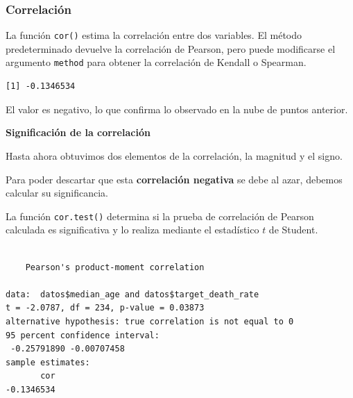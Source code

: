 \documentclass[
  letterpaper,
  DIV=11,
  numbers=noendperiod]{scrartcl}
\newenvironment{Shaded}{\begin{snugshade}}{\end{snugshade}}
\newcommand{\AttributeTok}[1]{\textcolor[rgb]{0.40,0.45,0.13}{#1}}
\newcommand{\FunctionTok}[1]{\textcolor[rgb]{0.28,0.35,0.67}{#1}}
\newcommand{\NormalTok}[1]{\textcolor[rgb]{0.00,0.23,0.31}{#1}}
\newcommand{\SpecialCharTok}[1]{\textcolor[rgb]{0.37,0.37,0.37}{#1}}
\newcommand{\StringTok}[1]{\textcolor[rgb]{0.13,0.47,0.30}{#1}}
\begin{document}
\subsubsection{Correlación}\label{correlaciuxf3n}

La función \texttt{cor()} estima la correlación entre dos variables. El
método predeterminado devuelve la correlación de Pearson, pero puede
modificarse el argumento \texttt{method} para obtener la correlación de
Kendall o Spearman.

\begin{Shaded}
\end{Shaded}

\begin{verbatim}
[1] -0.1346534
\end{verbatim}

El valor es negativo, lo que confirma lo observado en la nube de puntos
anterior.

\textbf{Significación de la correlación}

Hasta ahora obtuvimos dos elementos de la correlación, la magnitud y el
signo.

Para poder descartar que esta \textbf{correlación negativa} se debe al
azar, debemos calcular su significancia.

La función \texttt{cor.test()} determina si la prueba de correlación de
Pearson calculada es significativa y lo realiza mediante el estadístico
\(t\) de Student.

\begin{Shaded}
\end{Shaded}

\begin{verbatim}

    Pearson's product-moment correlation

data:  datos$median_age and datos$target_death_rate
t = -2.0787, df = 234, p-value = 0.03873
alternative hypothesis: true correlation is not equal to 0
95 percent confidence interval:
 -0.25791890 -0.00707458
sample estimates:
       cor 
-0.1346534 
\end{verbatim}
\end{document}
